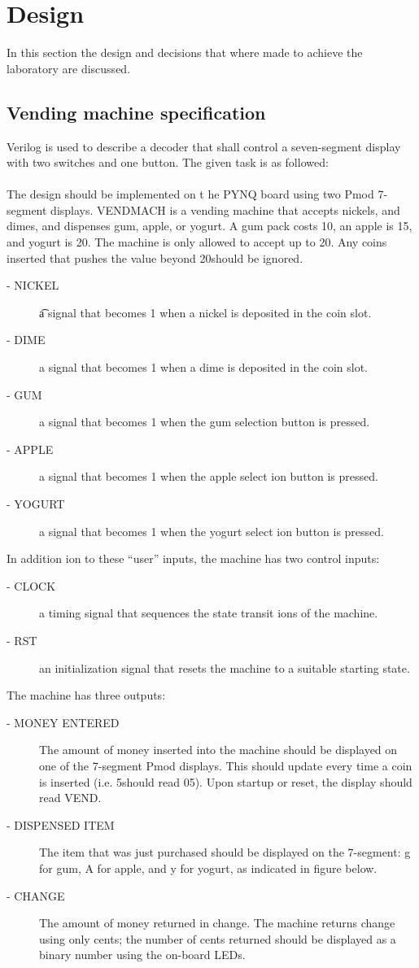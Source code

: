 \section{Design}\label{sec: Design}
In this section the design and decisions that where made to achieve the laboratory are discussed.

\subsection{Vending machine specification}\label{subsec: Vending machine specification}
Verilog is used to describe a decoder that shall control a seven-segment display with two switches and one button. The given task is as followed:
\\ \\
The design should be implemented on t he PYNQ board using two Pmod 7-segment displays.
VENDMACH is a vending machine that accepts nickels, and dimes, and dispenses gum, apple, or yogurt. A
gum pack costs 10\cent, an apple is 15\cent, and yogurt is 20\cent. The machine is only allowed to accept up to 20\cent. Any
coins inserted that pushes the value beyond 20\cent should be ignored.

\begin{description}
	\item[ - NICKEL]  \t a signal that becomes 1 when a nickel is deposited in the coin slot.
	\item[ - DIME] a signal that becomes 1 when a dime is deposited in the coin slot.
	\item[ - GUM] a signal that becomes 1 when the gum selection button is pressed.
	\item[ - APPLE] a signal that becomes 1 when the apple select ion button is pressed.
	\item[ - YOGURT] a signal that becomes 1 when the yogurt select ion button is pressed.
\end{description}
In addition ion to these “user” inputs, the machine has two control inputs:
\begin{description}
	\item[ - CLOCK] a timing signal that sequences the state transit ions of the machine.
	\item[ - RST] an initialization signal that resets the machine to a suitable starting
	state.
\end{description}
The machine has three outputs:
\begin{description}
	\item[ - MONEY ENTERED] The amount of money inserted into the machine should be displayed on one of the 7-segment Pmod displays. This should update every time a coin is inserted (i.e. 5\cent should read 05). Upon startup or reset, the display should read VEND.
	\item[ - DISPENSED ITEM] The item that was just purchased should be displayed on the 7-segment: g for gum, A for apple, and y for yogurt, as indicated in figure below.
	\item[ - CHANGE] The amount of money returned in change. The machine returns change using only	cents; the number of cents returned should be displayed as a binary number using the on-board LEDs.
\end{description}


